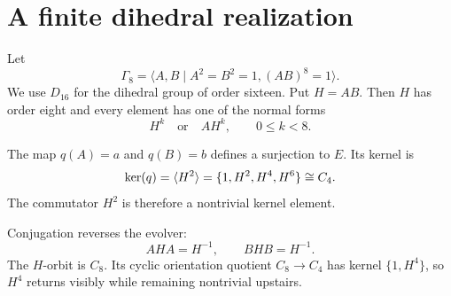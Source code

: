 \section{A finite dihedral realization}

Let
\[
\Gamma_8=
\langle A,B\mid A^2=B^2=1,(AB)^8=1\rangle.
\]
We use \(D_{16}\) for the dihedral group of order sixteen. Put \(H=AB\). Then \(H\)
has order eight and every element has one of the normal forms
\[
H^k\quad\text{or}\quad AH^k,
\qquad 0\leq k<8.
\]

The map \(q(A)=a\) and \(q(B)=b\) defines a surjection to \(E\). Its kernel is
\[
\operatorname{ker}(q)=\langle H^2\rangle
=\{1,H^2,H^4,H^6\}\cong C_4.
\]
The commutator \(H^2\) is therefore a nontrivial kernel element.

Conjugation reverses the evolver:
\[
AHA=H^{-1},
\qquad
BHB=H^{-1}.
\]
The \(H\)-orbit is \(C_8\). Its cyclic orientation quotient
\(C_8\to C_4\) has kernel \(\{1,H^4\}\), so \(H^4\) returns visibly
while remaining nontrivial
upstairs.
